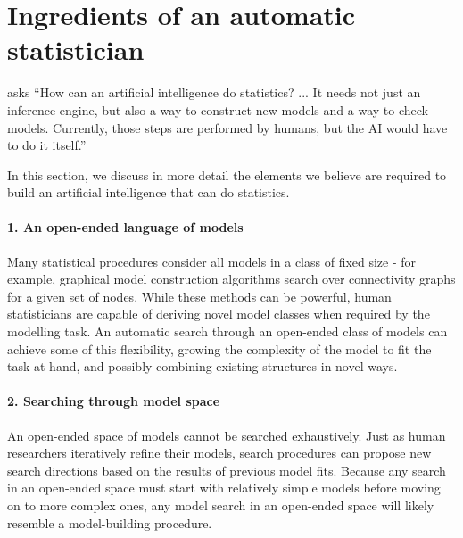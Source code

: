 \documentclass[letterpaper]{article}
\begin{document}
\section{Ingredients of an automatic statistician}
\label{sec:ingredients}
\citet{gelman2013philblogpost} asks ``How can an artificial intelligence do statistics? ... It needs not just an inference engine, but also a way to construct new models and a way to check models. Currently, those steps are performed by humans, but the AI would have to do it itself.''


In this section, we discuss in more detail the elements we believe are required to build an artificial intelligence that can do statistics.

\paragraph{1. An open-ended language of models}
Many statistical procedures consider all models in a class of fixed size - for example, graphical model construction algorithms search over connectivity graphs for a given set of nodes.
While these methods can be powerful, human statisticians are capable of deriving novel model classes when required by the modelling task.
An automatic search through an open-ended class of models can achieve some of this flexibility, growing the complexity of the model to fit the task at hand, and possibly combining existing structures in novel ways.

\paragraph{2. Searching through model space}
An open-ended space of models cannot be searched exhaustively.
Just as human researchers iteratively refine their models, search procedures can propose new search directions based on the results of previous model fits.
Because any search in an open-ended space must start with relatively simple models before moving on to more complex ones, any model search in an open-ended space will likely resemble a model-building procedure.%
\end{document}
